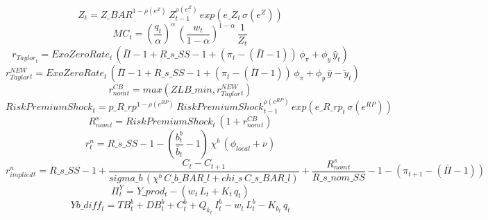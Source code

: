 \documentclass[10pt,a4paper]{article}
\begin{document}
\begin{dmath}
Z_{t}=Z\_BAR^{1- \rho(e^Z) }\, Z_{t-1}^{ \rho(e^Z) }\, exp\left(e\_Z_{t}\,  \sigma(e^Z) \right)
\end{dmath}
\begin{dmath}
MC_{t}=\left(\frac{q_{t}}{\alpha }\right)^{\alpha }\, \left(\frac{w_{t}}{1-\alpha }\right)^{1-\alpha }\, \frac{1}{Z_{t}}
\end{dmath}
\begin{dmath}
 r_{Taylor} _{t}=ExoZeroRate_{t}\, \left( \bar{\Pi} -1+R\_s\_SS-1+\left( \pi _{t}-\left( \bar{\Pi} -1\right)\right)\, \phi_{\pi}+\phi_{y}\,  \hat{y} _{t}\right)
\end{dmath}
\begin{dmath}
 r_{Taylor}^{NEW} _{t}=ExoZeroRate_{t}\, \left( \bar{\Pi} -1+R\_s\_SS-1+\left( \pi _{t}-\left( \bar{\Pi} -1\right)\right)\, \phi_{\pi}+\phi_{y}\,  \hat{y} - \tilde{y} _{t}\right)
\end{dmath}
\begin{dmath}
 r^{CB}_{nom}_{t}=max(ZLB\_min, r_{Taylor}^{NEW} _{t})
\end{dmath}
\begin{dmath}
 Risk Premium Shock _{t}=p\_R\_rp^{1-\rho(e^{RP}) }\,  Risk Premium Shock _{t-1}^{\rho(e^{RP}) }\, exp\left(e\_R\_rp_{t}\, \sigma(e^{RP}) \right)
\end{dmath}
\begin{dmath}
 R^s_{nom}_{t}= Risk Premium Shock _{t}\, \left(1+ r^{CB}_{nom}_{t}\right)
\end{dmath}
\begin{dmath}
 r^n _{t}=R\_s\_SS-1-\left(\frac{b^b_{t}}{ \bar{b} _{t}}-1\right)\, \chi^b \, \left(\phi_{local}+\nu \right)
\end{dmath}
\begin{dmath}
r^n_{implied}_{t}=R\_s\_SS-1+\frac{C_{t}-C_{t+1}}{sigma\_b\, \left(\chi^b \, C\_b\_BAR\_l+chi\_s\, C\_s\_BAR\_l\right)}+\frac{ R^s_{nom}_{t}}{R\_s\_nom\_SS}-1-\left( \pi _{t+1}-\left( \bar{\Pi} -1\right)\right)
\end{dmath}
\begin{dmath}
\Pi^Y_{t}=Y\_prod_{t}-\left(w_{t}\, L_{t}+K_{t}\, q_{t}\right)
\end{dmath}
\begin{dmath}
Yb\_diff_{t}=TB^b_{t}+DB^b_{t}+C^b_{t}+ Q_k _{t}\, I^b_{t}-w_{t}\, L^b_{t}-K_b_{t}\, q_{t}
\end{dmath}
\end{document}
